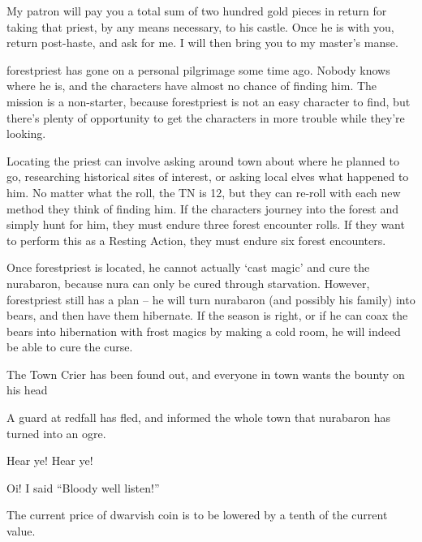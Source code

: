 \begin{multicols}{2}
\begin{speechtext}
	My patron will pay you a total sum of two hundred gold pieces in return for taking that priest, by any means necessary, to his castle.
	Once he is with you, return post-haste, and ask for me.
	I will then bring you to my master's manse.

\end{speechtext}

\Gls{forestpriest} has gone on a personal pilgrimage some time ago.
Nobody knows where he is, and the characters have almost no chance of finding him.
The mission is a non-starter, because \gls{forestpriest} is not an easy character to find, but there's plenty of opportunity to get the characters in more trouble while they're looking.

Locating the priest can involve asking around town about where he planned to go, researching historical sites of interest, or asking local elves what happened to him.
No matter what the roll, the TN is 12, but they can re-roll with each new method they think of finding him.
If the characters journey into the forest and simply hunt for him, they must endure three forest encounter rolls.
If they want to perform this as a Resting Action, they must endure six forest encounters.

Once \gls{forestpriest} is located, he cannot actually `cast magic' and cure the \gls{nurabaron}, because nura can only be cured through starvation.
However, \gls{forestpriest} still has a plan -- he will turn \gls{nurabaron} (and possibly his family) into bears, and then have them hibernate.
If the season is right, or if he can coax the bears into hibernation with frost magics by making a cold room, he will indeed be able to cure the curse.


{\N \N The Town Crier}%
{ has been found out, and everyone in town wants the bounty on his head}%

A guard at \gls{redfall} has fled, and informed the whole town that \gls{nurabaron} has turned into an ogre.

\begin{speechtext}

		Hear ye! Hear ye!

		Oi! I said ``Bloody well listen!''

		The current price of dwarvish coin is to be lowered by a tenth of the current value.


\end{speechtext}
\end{multicols}
